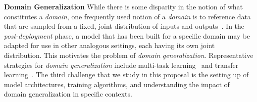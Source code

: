 \noindent \textbf{Domain Generalization}
While there is some disparity in the notion of what constitutes a \textit{domain}, one frequently used notion of a \textit{domain} is to reference data that are sampled from a fixed, joint distribution of inputs and outputs~\cite{wang2022generalizing}.
In the \textit{post-deployment} phase, a model that has been built for a specific domain may be adapted for use in other analogous settings, each having its own joint distribution.
This motivates the problem of \textit{domain generalization}. 
Representative strategies for \textit{domain generalization} include multi-task learning~\cite{caruana1997multitask} and transfer learning~\cite{zhuang2020comprehensive}.
The third challenge that we study in this proposal is the setting up of model architectures, training algorithms, and understanding the impact of domain generalization in specific contexts.



